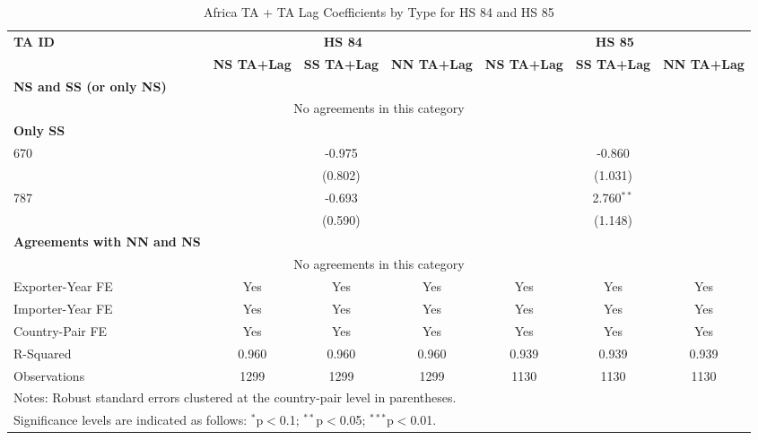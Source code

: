 \begin{table}[htbp]
    \centering
    \caption{Africa TA + TA Lag Coefficients by Type for HS 84 and HS 85}
    \label{tab:epuv_africa_pta}
    \begin{adjustbox}{max width=\textwidth}
    \begin{tabular}{lcccccc}
    \hline
    \textbf{TA ID} & \multicolumn{3}{c}{\textbf{HS 84}} & \multicolumn{3}{c}{\textbf{HS 85}} \\
    & \textbf{NS TA+Lag} & \textbf{SS TA+Lag} & \textbf{NN TA+Lag} & \textbf{NS TA+Lag} & \textbf{SS TA+Lag} & \textbf{NN TA+Lag} \\
    \hline
    \textbf{NS and SS (or only NS)} &  &  &  &  &  &  \\
    \hline
    \multicolumn{7}{c}{No agreements in this category} \\
    \hline
    \textbf{Only SS} &  &  &  &  &  &  \\
    \hline
    670 &  & -0.975 &  &  & -0.860 &  \\
     &  & (0.802) &  &  & (1.031) &  \\
    787 &  & -0.693 &  &  & 2.760$^{\ast\ast}$ &  \\
     &  & (0.590) &  &  & (1.148) &  \\
    \hline
    \textbf{Agreements with NN and NS} &  &  &  &  &  &  \\
    \hline
    \multicolumn{7}{c}{No agreements in this category} \\
    \hline
    Exporter-Year FE & Yes & Yes & Yes & Yes & Yes & Yes \\
    Importer-Year FE & Yes & Yes & Yes & Yes & Yes & Yes \\
    Country-Pair FE & Yes & Yes & Yes & Yes & Yes & Yes \\
    R-Squared & 0.960 & 0.960 & 0.960 & 0.939 & 0.939 & 0.939 \\
    Observations & 1299 & 1299 & 1299 & 1130 & 1130 & 1130 \\
    \hline
    \multicolumn{7}{l}{\footnotesize{Notes: Robust standard errors clustered at the country-pair level in parentheses.}} \\
    \multicolumn{7}{l}{\footnotesize{Significance levels are indicated as follows: $^{\ast}$p$<$0.1; $^{\ast\ast}$p$<$0.05; $^{\ast\ast\ast}$p$<$0.01.}} \\
    \end{tabular}
    \end{adjustbox}
\end{table}

